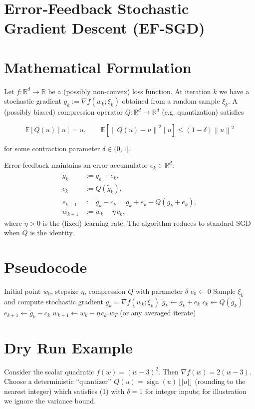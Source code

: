\documentclass{article}
\newcommand{\E}{\mathbb{E}}
\newcommand{\norm}[1]{\left\|#1\right\|}
\begin{document}
\section*{Error‑Feedback Stochastic Gradient Descent (EF‑SGD)}

\section*{Mathematical Formulation}
Let $f:\mathbb{R}^d\to\mathbb{R}$ be a (possibly non‑convex) loss function.  
At iteration $k$ we have a stochastic gradient $g_k:=\nabla f(w_k;\xi_k)$ obtained from a random sample $\xi_k$.  
A (possibly biased) compression operator $Q:\mathbb{R}^d\to\mathbb{R}^d$ (e.g. quantization) satisfies  

\[
\boxed{\E[Q(u)\mid u]=u,\qquad 
\E\!\left[\norm{Q(u)-u}^2\mid u\right]\le (1-\delta)\norm{u}^2}
\tag{1}
\]

for some contraction parameter $\delta\in(0,1]$.  

Error‑feedback maintains an error accumulator $e_k\in\mathbb{R}^d$:
\[
\begin{aligned}
\tilde g_k &:= g_k+e_k,\\
c_k &:= Q(\tilde g_k),\\
e_{k+1} &:= \tilde g_k-c_k = g_k+e_k-Q(g_k+e_k),\\
w_{k+1} &:= w_k-\eta\,c_k,
\end{aligned}
\tag{2}
\]
where $\eta>0$ is the (fixed) learning rate.  
The algorithm reduces to standard SGD when $Q$ is the identity.

\section*{Pseudocode}
\begin{algorithm}[h]
\caption{EF‑SGD}
\begin{algorithmic}[1]
\Require Initial point $w_0$, stepsize $\eta$, compression $Q$ with parameter $\delta$
\State $e_0\gets 0$
    \State Sample $\xi_k$ and compute stochastic gradient $g_k=\nabla f(w_k;\xi_k)$
    \State $\tilde g_k \gets g_k+e_k$
    \State $c_k \gets Q(\tilde g_k)$
    \State $e_{k+1}\gets \tilde g_k-c_k$ 
    \State $w_{k+1}\gets w_k-\eta\,c_k$
\EndFor
\State \Return $w_T$ (or any averaged iterate)
\end{algorithmic}
\end{algorithm}

\section*{Dry Run Example}
Consider the scalar quadratic $f(w)=(w-3)^2$.  
Then $\nabla f(w)=2(w-3)$.  
Choose a deterministic ``quantizer’’ $Q(u)=\operatorname{sign}(u)\,\lfloor|u|\rfloor$ (rounding to the nearest integer) which satisfies (1) with $\delta=1$ for integer inputs; for illustration we ignore the variance bound.
\end{document}
